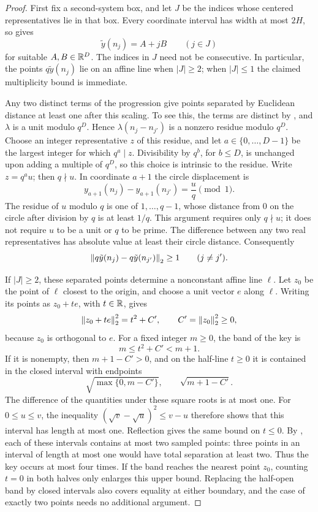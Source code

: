 \begin{proof}
First fix a second-system box, and let $J$ be the indices whose centered
representatives lie in that box.  Every coordinate interval has width at
most $2H$, so  gives
\[
 \tilde y(n_j)=A+jB\qquad(j\in J)
\]
for suitable $A,B\in\mathbb R^D$.  The indices in $J$ need not be consecutive.
In particular, the points $q\tilde y(n_j)$ lie on an affine line when
$|J|\ge2$; when $|J|\le1$ the claimed multiplicity bound is immediate.

Any two distinct terms of the progression give points separated by
Euclidean distance at least one after this scaling.  To see this, the
terms are distinct by , and $\lambda$ is a unit modulo
$q^D$.  Hence $\lambda(n_j-n_{j'})$ is a nonzero residue modulo $q^D$.
Choose an integer representative $z$ of this residue, and let
$a\in\{0,\ldots,D-1\}$ be the largest integer for which $q^a\mid z$.
Divisibility by $q^b$, for $b\le D$, is unchanged upon adding a multiple
of $q^D$, so this choice is intrinsic to the residue.  Write $z=q^a u$;
then $q\nmid u$.  In coordinate $a+1$ the circle displacement is
\[
 y_{a+1}(n_j)-y_{a+1}(n_{j'})=\frac{u}{q}\pmod1.
\]
The residue of $u$ modulo $q$ is one of $1,\ldots,q-1$, whose distance
from $0$ on the circle after division by $q$ is at least $1/q$.
This argument requires only $q\nmid u$; it does not require $u$ to be a
unit or $q$ to be prime.  The difference between any two real
representatives has absolute value at least their circle distance.
Consequently
\begin{equation}\label{perturb:separation}
 \left\lVert q\tilde y(n_j)-q\tilde y(n_{j'})\right\rVert_2\ge1
 \qquad(j\ne j').
\end{equation}

If $|J|\ge2$, these separated points determine a nonconstant affine
line $\ell$.  Let $z_0$ be the point of $\ell$ closest to the origin,
and choose a unit vector $e$ along $\ell$.  Writing its points as
$z_0+te$, with $t\in\mathbb R$, gives
\[
 \left\lVert z_0+te\right\rVert_2^2=t^2+C',\qquad C'=\left\lVert z_0\right\rVert_2^2\ge0,
\]
because $z_0$ is orthogonal to $e$.  For a fixed integer $m\ge0$, the
band of the key is
\[
 m\le t^2+C'<m+1.
\]
If it is nonempty, then $m+1-C'>0$, and on the half-line $t\ge0$ it
is contained in the closed interval with endpoints
\[
 \sqrt{\max\{0,m-C'\}},\qquad \sqrt{m+1-C'}.
\]
The difference of the quantities under these square roots is at most
one.  For $0\le u\le v$, the inequality
$(\sqrt v-\sqrt u)^2\le v-u$ therefore shows that this interval has
length at most one.  Reflection gives the same bound on $t\le0$.
By , each of these intervals contains at most
two sampled points: three points in an interval of length at most one
would have total separation at least two.  Thus the key occurs at most
four times.  If the band reaches the nearest point $z_0$, counting
$t=0$ in both halves only enlarges this upper bound.  Replacing the
half-open band by closed intervals also covers equality at either
boundary, and the case of exactly two points needs no additional
argument.
\end{proof}

